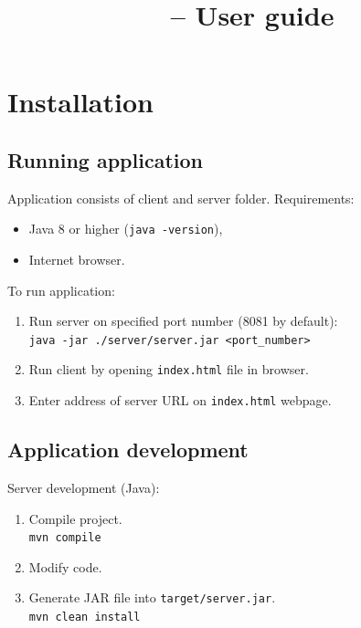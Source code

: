 \documentclass[12pt]{article}
\title{\appname \ \appversion \ -- User guide}
\begin{document}
\maketitle
\tableofcontents

\pagebreak

\section{Installation}

\subsection{Running application}\label{subsec:server}

Application consists of client and server folder. 
Requirements:
\begin{itemize}
    \setlength\itemsep{0em}
    \item Java 8 or higher (\texttt{java -version}),
    \item Internet browser. 
\end{itemize}

To run application:
\begin{enumerate}
    \setlength\itemsep{0em}
    \item Run server on specified port number (8081 by default):\\
          \texttt{java -jar ./server/server.jar <port\_number> }
    \item Run client by opening \texttt{index.html} file in browser.
    \item Enter address of server URL on \texttt{index.html} webpage.
\end{enumerate}

\subsection{Application development}

Server development (Java):
\begin{enumerate}
    \setlength\itemsep{0em}
    \item Compile project.\\
          \texttt{mvn compile}
    \item Modify code.
    \item Generate JAR file into \texttt{target/server.jar}.\\
          \texttt{mvn clean install}
\end{enumerate}
\end{document}

